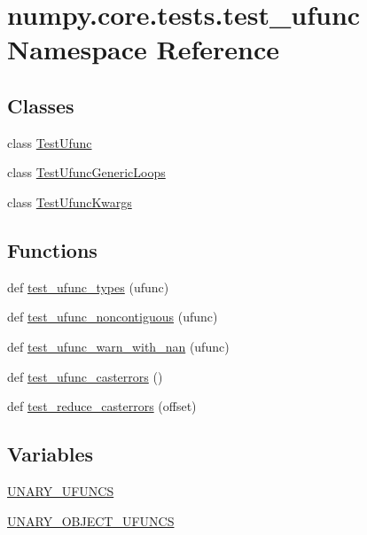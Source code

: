 \hypertarget{namespacenumpy_1_1core_1_1tests_1_1test__ufunc}{}\section{numpy.\+core.\+tests.\+test\+\_\+ufunc Namespace Reference}
\label{namespacenumpy_1_1core_1_1tests_1_1test__ufunc}
\subsection*{Classes}
\begin{DoxyCompactItemize}
\item 
class \hyperlink{classnumpy_1_1core_1_1tests_1_1test__ufunc_1_1TestUfunc}{Test\+Ufunc}
\item 
class \hyperlink{classnumpy_1_1core_1_1tests_1_1test__ufunc_1_1TestUfuncGenericLoops}{Test\+Ufunc\+Generic\+Loops}
\item 
class \hyperlink{classnumpy_1_1core_1_1tests_1_1test__ufunc_1_1TestUfuncKwargs}{Test\+Ufunc\+Kwargs}
\end{DoxyCompactItemize}
\subsection*{Functions}
\begin{DoxyCompactItemize}
\item 
def \hyperlink{namespacenumpy_1_1core_1_1tests_1_1test__ufunc_aee8de8e210cba17fa83502ee13078eac}{test\+\_\+ufunc\+\_\+types} (ufunc)
\item 
def \hyperlink{namespacenumpy_1_1core_1_1tests_1_1test__ufunc_a81a99b8ead30a4df2243806b6a097dfd}{test\+\_\+ufunc\+\_\+noncontiguous} (ufunc)
\item 
def \hyperlink{namespacenumpy_1_1core_1_1tests_1_1test__ufunc_a4f31933317456619f6c7ebf6c2ea94b1}{test\+\_\+ufunc\+\_\+warn\+\_\+with\+\_\+nan} (ufunc)
\item 
def \hyperlink{namespacenumpy_1_1core_1_1tests_1_1test__ufunc_ad8272c3a119904df4f3ff34b1bc1e074}{test\+\_\+ufunc\+\_\+casterrors} ()
\item 
def \hyperlink{namespacenumpy_1_1core_1_1tests_1_1test__ufunc_acd050016bc8c24e9a8dc083a27efa661}{test\+\_\+reduce\+\_\+casterrors} (offset)
\end{DoxyCompactItemize}
\subsection*{Variables}
\begin{DoxyCompactItemize}
\item 
\hyperlink{namespacenumpy_1_1core_1_1tests_1_1test__ufunc_a89161532f61599ade5101958a6090237}{U\+N\+A\+R\+Y\+\_\+\+U\+F\+U\+N\+CS}
\item 
\hyperlink{namespacenumpy_1_1core_1_1tests_1_1test__ufunc_aaa06d8141a337c0099fa35159d444840}{U\+N\+A\+R\+Y\+\_\+\+O\+B\+J\+E\+C\+T\+\_\+\+U\+F\+U\+N\+CS}
\end{DoxyCompactItemize}


